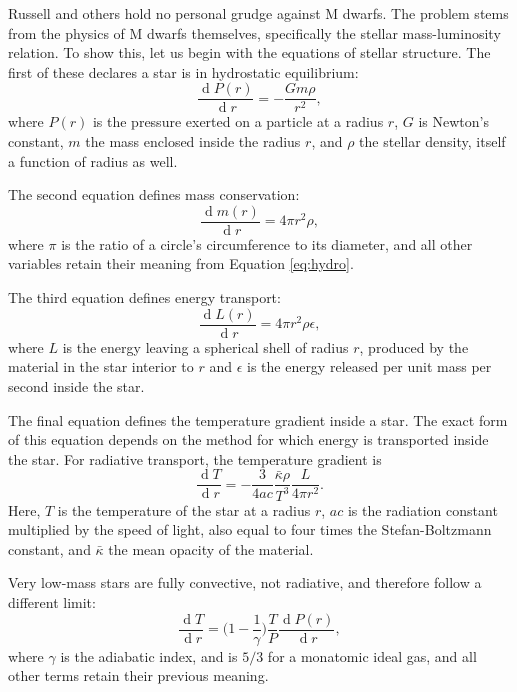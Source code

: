 \documentclass[12pt]{caltech_thesis}
\renewcommand{\d}[1]{\ensuremath{\operatorname{d}\!{#1}}}
\begin{document}
Russell and others hold no personal grudge against M dwarfs. The problem stems from the physics
of M dwarfs themselves, specifically the stellar mass-luminosity relation.
To show this, let us begin with the equations of stellar structure.
The first of these declares a star is in hydrostatic equilibrium:
\begin{equation}
\frac{\d P(r)}{\d r} = - \frac{ G m \rho}{r^2 },
\label{eq:hydro}
\end{equation}
where $P(r)$ is the pressure exerted on a particle at a radius $r$, $G$ is Newton's
constant, $m$ the mass enclosed inside the radius $r$, and $\rho$ the stellar density,
itself a function of radius as well.

The second equation defines mass conservation:
\begin{equation}
\frac{\d m(r)}{\d r} = 4 \pi r^2 \rho,
\end{equation}
where $\pi$ is the ratio of a circle's circumference to its diameter,
and all other variables retain their meaning from Equation \ref{eq:hydro}.

The third equation defines energy transport:
\begin{equation}
\frac{\d L(r)}{\d r} = 4 \pi r^2 \rho \epsilon,
\end{equation}
where $L$ is the energy leaving a spherical shell of radius $r$, produced by the
material in the star interior to $r$ and $\epsilon$ is the energy released per unit
mass per second inside the star.

The final equation defines the temperature gradient inside a star. 
The exact form of this equation depends on the method for which energy is transported
inside the star.
For radiative transport, the temperature gradient is
\begin{equation}
\frac{\d T}{\d r} = - \frac{3}{4ac} \frac{\bar{\kappa} \rho}{T^3} \frac{L}{4\pi r^2}.
\end{equation}
Here, $T$ is the temperature of the star at a radius $r$, $ac$ is the radiation constant multiplied by the speed of light, also equal to four times the Stefan-Boltzmann
constant, and $\bar{\kappa}$ the mean opacity of the material.

Very low-mass stars are fully convective, not radiative, and therefore follow
a different limit:
\begin{equation}
\frac{\d T}{\d r} =  \bigg( 1 - \frac{1}{\gamma}\bigg)\frac{T}{P}\frac{\d P(r)}{\d r},
\end{equation}
where $\gamma$ is the adiabatic index, and is $5/3$ for a monatomic ideal gas,
and all other terms retain their previous meaning.
\end{document}
